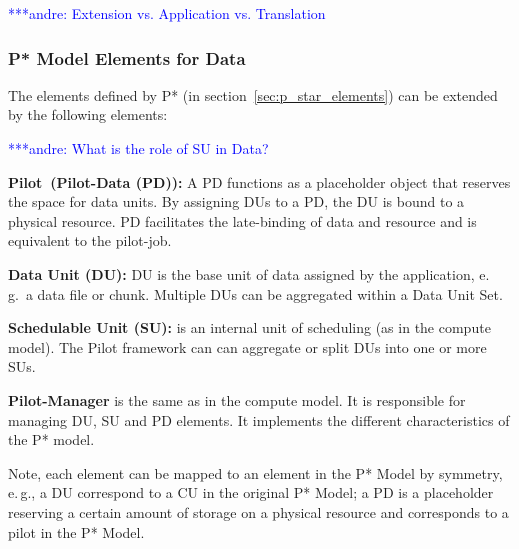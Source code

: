 \documentclass[conference,final]{IEEEtran}
\newcommand{\jhanote}[1]{ {\textcolor{red} { ***shantenu: #1 }}}
\newcommand{\alnote}[1]{ {\textcolor{blue} { ***andre: #1 }}}
\newcommand{\alnote}[1]{}
\newcommand{\jhanote}[1]{}
\newcommand{\pilot}{Pilot\xspace}
\newcommand{\cu}{CU\xspace}
\begin{document}

\alnote{Extension vs. Application vs. Translation}
\subsubsection*{P* Model Elements for Data}


The elements defined by P* (in section~\ref{sec:p_star_elements}) can
be extended by the following elements:

\alnote{What is the role of SU in Data?}
\begin{compactenum}[A.]

\item \textbf{\pilot \ (Pilot-Data  (PD)):} A PD functions as a placeholder
	  object that reserves the space for data units.  By assigning
	  DUs to a PD, the DU is bound to a physical resource.  PD
	  facilitates the late-binding of data and resource and is equivalent
	  to the pilot-job.

\item \textbf{Data Unit (DU):} DU is the base unit of data assigned by
  the application,  e.\,g.\ a data file or chunk. Multiple DUs can be aggregated 
   within a Data Unit Set.


\item \textbf{Schedulable Unit (SU):} is an internal unit of scheduling (as in 
the compute model). The Pilot framework can can aggregate or split DUs into one 
or more SUs.

\item \textbf{Pilot-Manager} is the same as in the compute model. It is
  responsible for managing DU, SU and PD elements. It implements the
  different characteristics of the P* model.
\end{compactenum}
 
Note, each element can be mapped to an element in the P* Model by
symmetry, e.\,g., a DU correspond to a \cu  in the original P* Model; 
a PD is a placeholder reserving a certain amount of storage on a physical 
resource and corresponds to a pilot in the P* Model.
\end{document}
